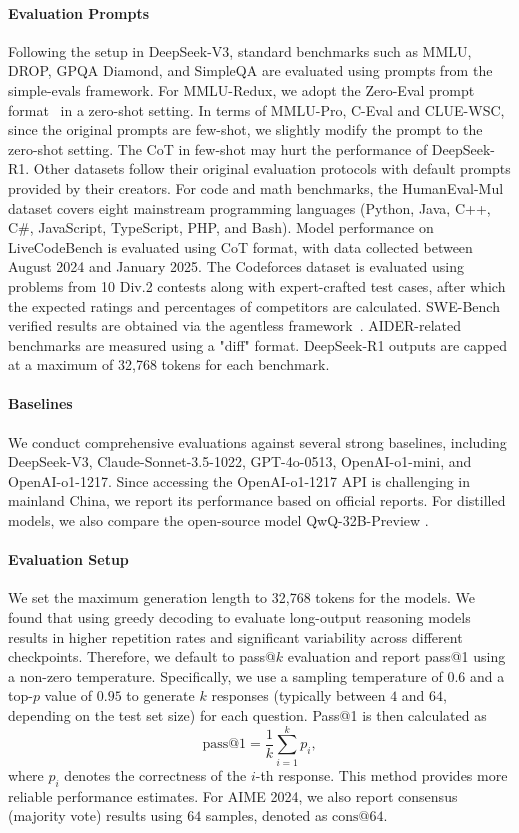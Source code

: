 \documentclass[11pt, a4paper, logo, copyright, nonumbering]{deepseek}
\newcommand{\dsri}{DeepSeek-R1}
\begin{document}
\paragraph{Evaluation Prompts} Following the setup in DeepSeek-V3, standard benchmarks such as MMLU, DROP, GPQA Diamond, and SimpleQA are evaluated using prompts from the simple-evals framework. For MMLU-Redux, we adopt the Zero-Eval prompt format~\citep{Lin_ZeroEval_A_Unified_2024} in a zero-shot setting. In terms of MMLU-Pro, C-Eval and CLUE-WSC, since the original prompts are few-shot, we slightly modify the prompt to the zero-shot setting. The CoT in few-shot may hurt the performance of  \dsri{}. 
Other datasets follow their original evaluation protocols with default prompts provided by their creators. 
For code and math benchmarks, the HumanEval-Mul dataset covers eight mainstream programming languages (Python, Java, C++, C\#, JavaScript, TypeScript, PHP, and Bash). 
Model performance on LiveCodeBench is evaluated using  CoT format, with data collected between August 2024 and January 2025. The Codeforces dataset is evaluated using problems from 10 Div.2 contests along with expert-crafted test cases, after which the expected ratings and percentages of competitors are calculated. SWE-Bench verified results are obtained via the agentless framework~\citep{agentless}. AIDER-related benchmarks are measured using a "diff" format.
\dsri{} outputs are capped at a maximum of 32,768 tokens for each benchmark.


\paragraph{Baselines} We conduct comprehensive evaluations against several strong baselines, including DeepSeek-V3, Claude-Sonnet-3.5-1022, GPT-4o-0513, OpenAI-o1-mini, and OpenAI-o1-1217. Since accessing the OpenAI-o1-1217 API is challenging in mainland China, we report its performance based on official reports.
For distilled models, we also compare the open-source model QwQ-32B-Preview \citep{QwQ}.




\paragraph{Evaluation Setup}
We set the maximum generation length to 32,768 tokens for the models.
We found that using greedy decoding to evaluate long-output reasoning models results in higher repetition rates and significant variability across different checkpoints.
Therefore, we default to pass@$k$ evaluation \citep{codex} and report pass@1 using a non-zero temperature.
Specifically, we use a sampling temperature of $0.6$ and a top-$p$ value of $0.95$ to generate $k$ responses (typically between $4$ and $64$, depending on the test set size) for each question. Pass@1 is then calculated as
\[
\text{pass@1} = \frac{1}{k} \sum_{i=1}^{k} p_i,
\]
where $p_i$ denotes the correctness of the $i$-th response. This method provides more reliable performance estimates.
For AIME 2024, we also report consensus (majority vote) results \citep{wang2022self} using $64$ samples, denoted as $\text{cons}@64$.
\end{document}
